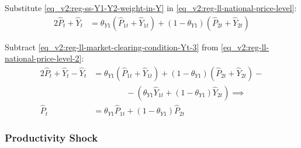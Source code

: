 \documentclass[../thesis.tex]{subfiles}
\begin{document}
	\begin{comment}
		Define the regional weights $\langle \begin{smallmatrix} \theta_{PY1} & (1-\theta_{PY1}) \end{smallmatrix} \rangle$ in the gross domestic production:
		\begin{align}
			\left\langle \begin{matrix} \theta_{PY1} & (1-\theta_{PY1}) \end{matrix} \right\rangle \coloneq \left\langle \begin{matrix} \frac{P_{1} Y_{1}}{P Y} & \frac{P_{2} Y_{2}}{PY} \end{matrix} \right\rangle \label{eq_v2:reg-ss-PYn-weight-in-PY}
		\end{align}
		
		Substitute \ref{eq_v2:reg-ss-PYn-weight-in-PY} in \ref{eq_v2:reg-ll-national-price-level}:
		
	\end{comment}


Substitute \ref{eq_v2:reg-ss-Y1-Y2-weight-in-Y} in \ref{eq_v2:reg-ll-national-price-level}:
\begin{alignat}{2}
	\hat{P}_{t} + \hat{Y}_{t} &= \theta_{Y1} (\hat{P}_{1t} + \hat{Y}_{1t}) + (1-\theta_{Y1}) (\hat{P}_{2t} + \hat{Y}_{2t})  \label{eq_v2:reg-ll-national-price-level-2}
\end{alignat}

Subtract \ref{eq_v2:reg-ll-market-clearing-condition-Yt-3} from \ref{eq_v2:reg-ll-national-price-level-2}:
\begin{alignat}{2}
	\hat{P}_{t} + \hat{Y}_{t} - \hat{Y}_{t} &= \theta_{Y1} (\hat{P}_{1t} + \hat{Y}_{1t}) + (1-\theta_{Y1}) (\hat{P}_{2t} + \hat{Y}_{2t}) - \nonumber \\ & \qquad \qquad - (\theta_{Y1} \hat{Y}_{1t} + (1-\theta_{Y1}) \hat{Y}_{2t}) \implies \nonumber \\
	\hat{P}_{t} &= \theta_{Y1} \hat{P}_{1t} + (1-\theta_{Y1}) \hat{P}_{2t} \label{eq_v2:reg-ll-national-price-level-3}
\end{alignat}


\subsubsection*{Productivity Shock}
\end{document}
